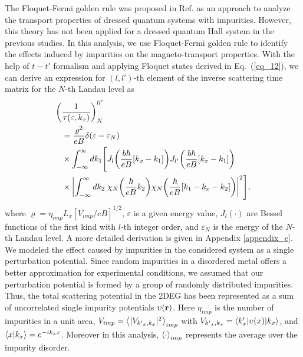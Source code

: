 
The Floquet-Fermi golden rule was proposed in Ref. \cite{wackerl20} as an approach to analyze the transport properties of dressed quantum systems with impurities.
However, this theory has not been applied for a dressed quantum Hall system in the previous studies. In this analysis, we use Floquet-Fermi golden rule to identify the effects induced by impurities on the magneto-transport properties.
With the help of $t-t'$ formalism \cite{wackerl20,grifoni98,sambe75,peskin93,althorpe97} and applying Floquet states derived in Eq.~(\ref{eq_12}), we can derive an  expression for $(l,l')$-th element of the inverse scattering time matrix for the $N$-th Landau level as
\begin{equation} \label{eq_13}
  \begin{aligned}
    \bigg(&\frac{1}{\tau(\varepsilon,k_x)}\bigg)^{ll'}_{N} \\
    & =
    \frac { \varrho^2}{eB}
    \delta(\varepsilon - \varepsilon_{N}) \\
    & \times
    \int_{-\infty}^{\infty} d k_1 \Bigg[
    J_l\qty(\frac{b\hbar}{eB}[{k}_x - k_1])
    J_{l'}\qty(\frac{b\hbar}{eB}[{k}_x - k_1]) \\
    & \times
    \qty|
    \int_{-\infty}^{\infty} dk_2 \;
    {\chi}_{N}\qty(\frac{\hbar}{eB}k_2)
    {\chi}_{N}\qty(\frac{\hbar}{eB} \qty[k_1 - {k}_x - k_2])|^2\Bigg],
  \end{aligned}
\end{equation}
where $\varrho = \eta_{imp} L_x [ { V_{imp}}/{eB}]^{1/2}$, $\varepsilon$ is a given energy value, $J_l(\cdot)$ are Bessel functions of the first kind with $l$-th integer order, and $\varepsilon_N$ is the energy of the $N$-th Landau level.
A more detailed derivation is given in Appendix \ref{appendix_c}.
We modeled the effect caused by impurities in the considered system as a single perturbation potential.
Since random impurities in a disordered metal offers a better approximation for experimental conditions, we assumed that our perturbation potential is formed by a group of randomly distributed impurities.
Thus, the total scattering potential in the 2DEG has been represented as a sum of uncorrelated single impurity potentials $\upsilon(\vb{r})$. Here $\eta_{imp}$ is the number of impurities in a unit area, $V_{imp} = \expval{|V_{{k'}_x,k_x}|^2}_{imp}$ with $V_{{k'}_x,k_x} = \mel**{k'_x}{\upsilon(x) }{k_x}$, and $\braket{x}{k_x} = e^{-ik_x x}$.
Moreover in this analysis, $\expval{\cdot}_{imp}$ represents the average over the impurity disorder.

